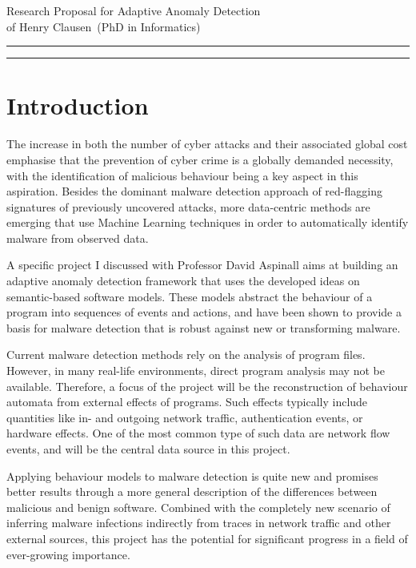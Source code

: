 \documentclass[11pt]{article}
\newcommand{\soptitle}{Research Proposal for Adaptive Anomaly Detection}
\newcommand{\yourname}{Henry Clausen}
\begin{document}
\begin{center}\LARGE\soptitle\\
\normalsize of \yourname\ (PhD in Informatics)
\end{center}
\vspace{-0.2cm}
\hrule
\vspace{1pt}
\hrule height 1pt

\bigskip

\section{Introduction}
The increase in both the number of cyber attacks and their associated global cost emphasise that the prevention of cyber crime is a globally demanded necessity, with the identification of malicious behaviour being a key aspect in this aspiration. Besides the dominant malware detection approach of red-flagging signatures of previously uncovered attacks, more data-centric methods are emerging that use Machine Learning techniques in order to automatically identify malware from observed data.%

A specific project I discussed with Professor David Aspinall aims at building an adaptive anomaly detection framework that uses the developed ideas on semantic-based software models. These models abstract the behaviour of a program into sequences  of  events and  actions, and have been shown to provide a  basis for malware detection that is robust against new or transforming malware.

Current malware detection methods rely on the analysis of program files. However, in many real-life environments, direct program analysis may not be available. Therefore, a focus of the project will be the reconstruction of behaviour automata from external effects of programs. Such effects typically include quantities like in- and outgoing network traffic, authentication events, or hardware effects. One of the most common type of such data are network flow events, and will be the central data source in this project.

Applying  behaviour models to malware detection is quite new and promises better results through a more general description of the differences between malicious and benign software. Combined with the completely new scenario of inferring malware infections indirectly from traces in network traffic and other external sources, this project has the potential for significant progress in a field of ever-growing importance.
\end{document}
